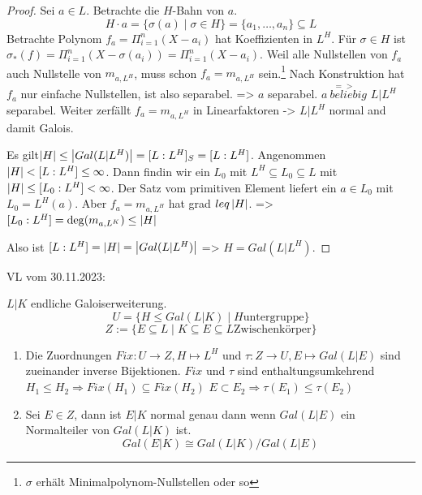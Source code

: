 \documentclass[../main.tex]{subfiles}
\begin{document}
\begin{proof}
    Sei $a\in L$. Betrachte die $H$-Bahn von $a$.
    $$H\cdot a = \{\sigma(a)\mid \sigma\in H\} = \{a_1,\dots, a_n\} \subseteq L$$
    Betrachte Polynom $f_a = \Pi_{i=1}^n (X-a_i)$ hat Koeffizienten in $L^H$.
    Für $\sigma\in H$ ist $\sigma_*(f) = \Pi_{i=1}^n(X-\sigma(a_i)) = \Pi_{i=1}^n(X-a_i)$.
    Weil alle Nullstellen von $f_a$ auch Nullstelle von $m_{a,L^H}$, muss schon $f_a=m_{a,L^H}$ sein.\footnote{$\sigma$ erhält Minimalpolynom-Nullstellen oder so}
    Nach Konstruktion hat $f_a$ nur einfache Nullstellen, ist also separabel. => $a$ separabel. $\overset{=>}{a\ beliebig}$ $L|L^H$separabel.
    Weiter zerfällt $f_a=m_{a,L^H}$ in Linearfaktoren -> $L|L^H$ normal and damit Galois.

    Es gilt$\left\vert H \right\vert\leq \left\vert Gal(L|L^H) \right\vert = [L:L^H]_S = [L:L^H]$.
    Angenommen $\left\vert H \right\vert < [L:L^H]\leq \infty$. 
    Dann findin wir ein $L_0$ mit $L^H\subseteq L_0 \subseteq L$ mit $\left\vert H \right\vert \leq [L_0:L^H] <\infty$.
    Der Satz vom primitiven Element liefert ein $a\in L_0$ mit $L_0 = L^H(a)$.
    Aber $f_a=m_{a,L^H}$ hat grad $leq \left\vert H \right\vert$.
    => $[L_0:L^H] = \deg(m_{a,L^K})\leq \left\vert H \right\vert$ \Lightning

    Also ist $[L:L^H] = \left\vert H \right\vert = \left\vert Gal(L|L^H) \right\vert$
    => $H=Gal(L|L^H)$.
\end{proof}
\begin{flushright}
VL vom 30.11.2023:
\end{flushright}
\begin{theorem}[Hauptsatz]
    $L|K$ endliche Galoiserweiterung.
    $$U=\{H\leq Gal(L|K) \mid H \text{untergruppe}\}$$
    $$Z:= \{E\subseteq L \mid K\subseteq E \subseteq L \text{Zwischenkörper}\}$$
    \begin{enumerate}%
        \item Die Zuordnungen $Fix: U \rightarrow Z, H\mapsto L^H$ und $\tau: Z\rightarrow U, E \mapsto Gal(L|E)$
        sind zueinander inverse Bijektionen.
        $Fix$ und $\tau$ sind enthaltungsumkehrend
        $H_1\leq H_2 \Rightarrow Fix(H_1) \subseteq Fix(H_2)$
        $E\subset E_2 \Rightarrow \tau(E_1) \leq \tau(E_2)$
        \item Sei $E \in Z$, dann ist $E|K$ normal genau dann wenn $Gal(L|E)$ ein Normalteiler von $Gal(L|K)$ ist.
        $$ Gal(E|K) \cong Gal(L|K)/Gal(L|E)$$
    \end{enumerate}
\end{theorem}
\end{document}
